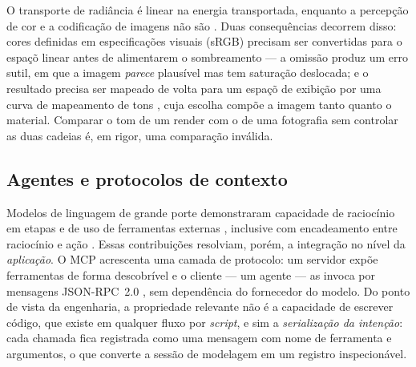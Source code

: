 O transporte de radi\^ancia \'e linear na energia transportada, enquanto a percep\c{c}\~ao
de cor e a codifica\c{c}\~ao de imagens n\~ao s\~ao \cite{fairchild2013}. Duas
consequ\^encias decorrem disso: cores definidas em especifica\c{c}\~oes visuais (sRGB)
precisam ser convertidas para o espa\c{c}\~o linear antes de alimentarem o sombreamento
--- a omiss\~ao produz um erro sutil, em que a imagem \emph{parece} plaus\'ivel mas tem
satura\c{c}\~ao deslocada; e o resultado precisa ser mapeado de volta para um
espa\c{c}\~o de exibi\c{c}\~ao por uma curva de mapeamento de tons \cite{reinhard2002},
cuja escolha comp\~oe a imagem tanto quanto o material. Comparar o tom de um render com o
de uma fotografia sem controlar as duas cadeias \'e, em rigor, uma
compara\c{c}\~ao inv\'alida.

\subsection{Agentes e protocolos de contexto}

Modelos de linguagem de grande porte demonstraram capacidade de racioc\'inio em etapas e de
uso de ferramentas externas \cite{schick2023, patil2023, qin2023}, inclusive com
encadeamento entre racioc\'inio e a\c{c}\~ao \cite{yao2023}. Essas contribui\c{c}\~oes
resolviam, por\'em, a integra\c{c}\~ao no n\'ivel da \emph{aplica\c{c}\~ao}. O MCP
\cite{mcpspec2024} acrescenta uma camada de protocolo: um servidor exp\~oe ferramentas de
forma descobr\'ivel e o cliente --- um agente --- as invoca por mensagens
JSON-RPC~2.0 \cite{jsonrpc2020}, sem depend\^encia do fornecedor do modelo. Do ponto de
vista da engenharia, a propriedade relevante n\~ao \'e a capacidade de escrever
c\'odigo, que existe em qualquer fluxo por \emph{script}, e sim a
\emph{serializa\c{c}\~ao da inten\c{c}\~ao}: cada chamada fica registrada como uma
mensagem com nome de ferramenta e argumentos, o que converte a sess\~ao de modelagem em um
registro inspecion\'avel.
